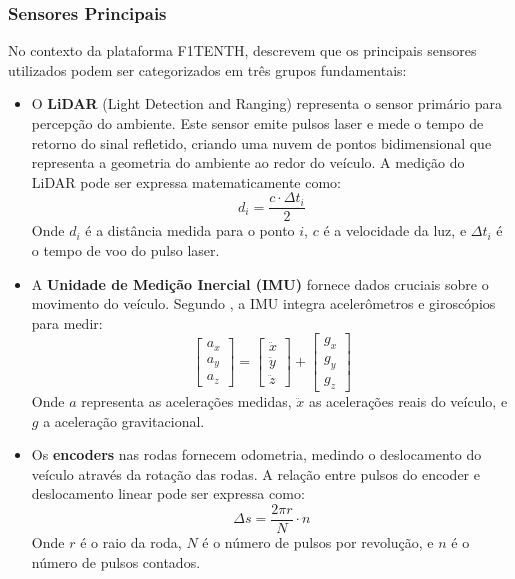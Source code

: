 \subsubsection{Sensores Principais}

No contexto da plataforma F1TENTH, \cite{OKelly2020F1TENTH} descrevem que os
principais sensores utilizados podem ser categorizados em três grupos
fundamentais:

\begin{itemize}
    \item O \textbf{LiDAR} (Light Detection and Ranging) representa o sensor primário
          para percepção do ambiente. Este sensor emite pulsos laser e mede o tempo de
          retorno do sinal refletido, criando uma nuvem de pontos bidimensional que
          representa a geometria do ambiente ao redor do veículo. A medição do LiDAR pode
          ser expressa matematicamente como:
          \begin{equation}
              d_i = \frac{c \cdot \Delta t_i}{2}
          \end{equation}
          Onde $d_i$ é a distância medida para o ponto $i$, $c$ é a velocidade da luz, e $\Delta t_i$ é o tempo de voo do pulso laser.

    \item A \textbf{Unidade de Medição Inercial (IMU)} fornece dados cruciais sobre o
          movimento do veículo. Segundo \cite{Stachowicz2023FastRLAP}, a IMU integra
          acelerômetros e giroscópios para medir:
          \begin{equation}
              \begin{bmatrix}
                  a_x \\
                  a_y \\
                  a_z
              \end{bmatrix} =
              \begin{bmatrix}
                  \ddot{x} \\
                  \ddot{y} \\
                  \ddot{z}
              \end{bmatrix} +
              \begin{bmatrix}
                  g_x \\
                  g_y \\
                  g_z
              \end{bmatrix}
          \end{equation}
          Onde $a$ representa as acelerações medidas, $\ddot{x}$ as acelerações reais do veículo, e $g$ a aceleração gravitacional.

    \item Os \textbf{encoders} nas rodas fornecem odometria, medindo o deslocamento do
          veículo através da rotação das rodas. A relação entre pulsos do encoder e
          deslocamento linear pode ser expressa como:
          \begin{equation}
              \Delta s = \frac{2\pi r}{N} \cdot n
          \end{equation}
          Onde $r$ é o raio da roda, $N$ é o número de pulsos por revolução, e $n$ é o número de pulsos contados.
\end{itemize}

